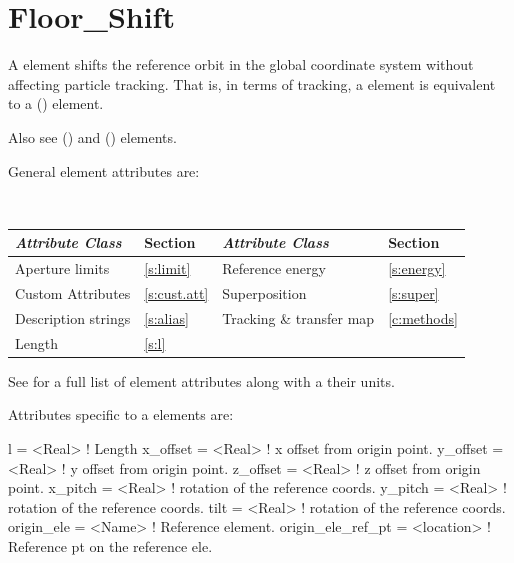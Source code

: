 \section{Floor_Shift}
\label{s:floor.ele}

A  element shifts the reference orbit in the global coordinate system without
affecting particle tracking. That is, in terms of tracking, a  element is equivalent
to a  () element. 

Also see  () and  () elements.

General  element attributes are:
\begin{center}
\tt
\begin{tabular}{llll} \toprule
  {\sl Attribute Class}      & Section           & {\sl Attribute Class}      & Section         \\ \midrule
  Aperture limits            & \ref{s:limit}     & Reference energy           & \ref{s:energy}  \\
  Custom Attributes          & \ref{s:cust.att}  & Superposition              & \ref{s:super}   \\
  Description strings        & \ref{s:alias}     & Tracking \& transfer map   & \ref{c:methods} \\
  Length                     & \ref{s:l}         &                            &                 \\
  \bottomrule
\end{tabular}
\end{center}
\toffset
See  for a full list of element attributes along with a their units.

Attributes specific to a  elements are:
\begin{example}
  l                 = <Real>     ! Length
  x_offset          = <Real>     ! x offset from origin point.
  y_offset          = <Real>     ! y offset from origin point.
  z_offset          = <Real>     ! z offset from origin point.
  x_pitch           = <Real>     ! rotation of the reference coords.
  y_pitch           = <Real>     ! rotation of the reference coords.
  tilt              = <Real>     ! rotation of the reference coords.
  origin_ele        = <Name>     ! Reference element.
  origin_ele_ref_pt = <location> ! Reference pt on the reference ele.
\end{example}

